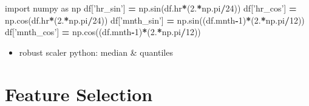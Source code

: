 \documentclass[]{book}
\newenvironment{Shaded}{\begin{snugshade}}{\end{snugshade}}
\newcommand{\DecValTok}[1]{\textcolor[rgb]{0.00,0.00,0.81}{#1}}
\newcommand{\StringTok}[1]{\textcolor[rgb]{0.31,0.60,0.02}{#1}}
\newcommand{\ImportTok}[1]{#1}
\newcommand{\OperatorTok}[1]{\textcolor[rgb]{0.81,0.36,0.00}{\textbf{#1}}}
\newcommand{\NormalTok}[1]{#1}
\providecommand{\tightlist}{%
  \setlength{\itemsep}{0pt}\setlength{\parskip}{0pt}}
\theoremstyle{definition}
\theoremstyle{definition}
\theoremstyle{definition}
\theoremstyle{remark}
\begin{document}
\begin{Shaded}
\begin{Highlighting}[]
\ImportTok{import}\NormalTok{ numpy }\ImportTok{as}\NormalTok{ np}
\NormalTok{df[}\StringTok{'hr_sin'}\NormalTok{] }\OperatorTok{=}\NormalTok{ np.sin(df.hr}\OperatorTok{*}\NormalTok{(}\DecValTok{2}\NormalTok{.}\OperatorTok{*}\NormalTok{np.pi}\OperatorTok{/}\DecValTok{24}\NormalTok{))}
\NormalTok{df[}\StringTok{'hr_cos'}\NormalTok{] }\OperatorTok{=}\NormalTok{ np.cos(df.hr}\OperatorTok{*}\NormalTok{(}\DecValTok{2}\NormalTok{.}\OperatorTok{*}\NormalTok{np.pi}\OperatorTok{/}\DecValTok{24}\NormalTok{))}
\NormalTok{df[}\StringTok{'mnth_sin'}\NormalTok{] }\OperatorTok{=}\NormalTok{ np.sin((df.mnth}\OperatorTok{-}\DecValTok{1}\NormalTok{)}\OperatorTok{*}\NormalTok{(}\DecValTok{2}\NormalTok{.}\OperatorTok{*}\NormalTok{np.pi}\OperatorTok{/}\DecValTok{12}\NormalTok{))}
\NormalTok{df[}\StringTok{'mnth_cos'}\NormalTok{] }\OperatorTok{=}\NormalTok{ np.cos((df.mnth}\OperatorTok{-}\DecValTok{1}\NormalTok{)}\OperatorTok{*}\NormalTok{(}\DecValTok{2}\NormalTok{.}\OperatorTok{*}\NormalTok{np.pi}\OperatorTok{/}\DecValTok{12}\NormalTok{))}
\end{Highlighting}
\end{Shaded}

\begin{itemize}
\tightlist
\item
  robust scaler python: median \& quantiles
\end{itemize}

\section{Feature Selection}\label{feature-selection}
\end{document}
